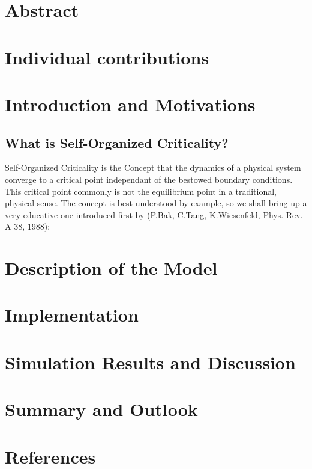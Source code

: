 \documentclass[11pt]{article}
\begin{document}



\section{Abstract}

\section{Individual contributions}

\section{Introduction and Motivations}
\subsection{What is Self-Organized Criticality?}
Self-Organized Criticality is the Concept that the dynamics of a physical system converge to a critical point independant of the bestowed boundary conditions. This critical point commonly is not the equilibrium point in a traditional, physical sense. The concept is best understood by example, so we shall bring up a very educative one introduced first by (P.Bak, C.Tang, K.Wiesenfeld, Phys. Rev. A 38, 1988):


\section{Description of the Model}

\section{Implementation}

\section{Simulation Results and Discussion}

\section{Summary and Outlook}

\section{References}
\end{document}
